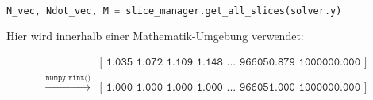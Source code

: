 \begin{lstlisting}[language=Python, numbers=none]
N_vec, Ndot_vec, M = slice_manager.get_all_slices(solver.y)
\end{lstlisting}

Hier wird innerhalb einer Mathematik-Umgebung verwendet:

\begin{align}
                                                          & \texttt{[ 1.035  1.072  1.109  1.148 ... 966050.879  1000000.000 ]} \label{notrounded} \\
    \stackrel{ \texttt{numpy.rint()} }{ \longrightarrow } & \texttt{[ 1.000  1.000  1.000  1.000 ... 966051.000  1000000.000 ]}
\end{align}
